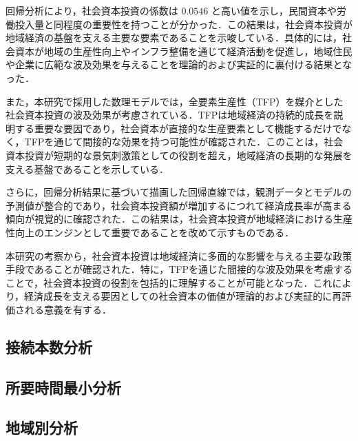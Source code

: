 回帰分析により，社会資本投資の係数は \( 0.0546 \) と高い値を示し，民間資本や労働投入量と同程度の重要性を持つことが分かった．この結果は，社会資本投資が地域経済の基盤を支える主要な要素であることを示唆している．具体的には，社会資本が地域の生産性向上やインフラ整備を通じて経済活動を促進し，地域住民や企業に広範な波及効果を与えることを理論的および実証的に裏付ける結果となった．

また，本研究で採用した数理モデルでは，全要素生産性（TFP）を媒介とした社会資本投資の波及効果が考慮されている．TFPは地域経済の持続的成長を説明する重要な要因であり，社会資本が直接的な生産要素として機能するだけでなく，TFPを通じて間接的な効果を持つ可能性が確認された．このことは，社会資本投資が短期的な景気刺激策としての役割を超え，地域経済の長期的な発展を支える基盤であることを示している．

さらに，回帰分析結果に基づいて描画した回帰直線では，観測データとモデルの予測値が整合的であり，社会資本投資額が増加するにつれて経済成長率が高まる傾向が視覚的に確認された．この結果は，社会資本投資が地域経済における生産性向上のエンジンとして重要であることを改めて示すものである．

本研究の考察から，社会資本投資は地域経済に多面的な影響を与える主要な政策手段であることが確認された．特に，TFPを通じた間接的な波及効果を考慮することで，社会資本投資の役割を包括的に理解することが可能となった．これにより，経済成長を支える要因としての社会資本の価値が理論的および実証的に再評価される意義を有する．

\subsection{接続本数分析}

\subsection{所要時間最小分析}

\subsection{地域別分析}

